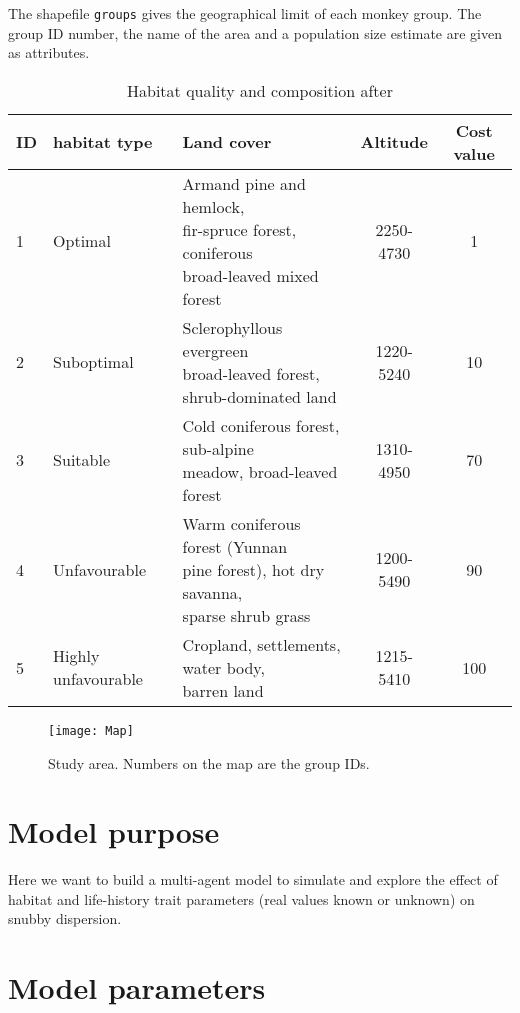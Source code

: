  The shapefile \texttt{groups} gives the geographical limit of each monkey group. The group ID number, the name of the area and a population size estimate are given as attributes.

 \begin{table}[ht]
 	\centering
 	\caption{Habitat quality and composition after \citet{Li2017}}
 	\label{tab:habitats}
 	\begin{tabular}{lllcc}
 		\hline
 		ID & habitat type & Land cover & Altitude & Cost value \\
 		\hline
 		 1&Optimal & \makecell[l]{Armand pine and hemlock,\\ fir-spruce forest, coniferous \\broad-leaved mixed forest} & 2250-4730 & 1 \\
 		 2&Suboptimal  & \makecell[l]{Sclerophyllous evergreen \\broad-leaved forest,\\ shrub-dominated land} & 1220-5240 & 10 \\
 		 3&Suitable &  \makecell[l]{Cold coniferous forest, sub-alpine\\ meadow, broad-leaved forest} & 1310-4950 & 70 \\
 		 4&Unfavourable  & \makecell[l]{Warm coniferous forest (Yunnan \\pine forest), hot dry savanna, \\sparse shrub grass} & 1200-5490 &90 \\
 		 5&Highly unfavourable  & \makecell[l]{Cropland, settlements, water body,\\ barren land} & 1215-5410 & 100 \\
 		\hline
 	\end{tabular}
 \end{table}
 
 
 \begin{figure}[ht]
 	\centering
 	\texttt{[image: Map]}
 	\caption{Study area. Numbers on the  map are the group IDs.}
 	\label{fig:studyarea}
 \end{figure}

\section{Model purpose}
Here we want to build a multi-agent model to simulate and explore the effect of habitat and life-history trait 
parameters (real values known or unknown) on snubby dispersion.

\section{Model parameters}

